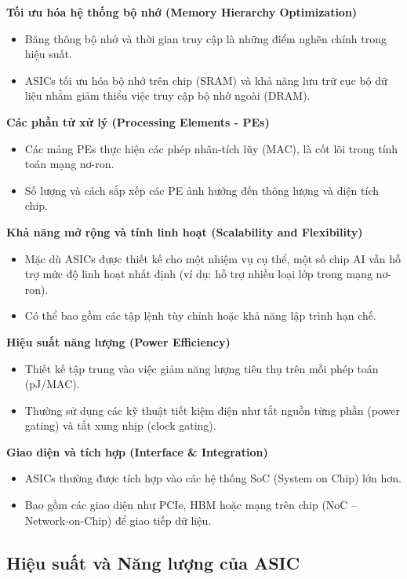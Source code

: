 \documentclass[a4paper]{article}
\begin{document}
\textbf{Tối ưu hóa hệ thống bộ nhớ (Memory Hierarchy Optimization)}
\begin{itemize}
    \item Băng thông bộ nhớ và thời gian truy cập là những điểm nghẽn chính trong hiệu suất.
    \item ASICs tối ưu hóa bộ nhớ trên chip (SRAM) và khả năng lưu trữ cục bộ dữ liệu nhằm giảm thiểu việc truy cập bộ nhớ ngoài (DRAM).
\end{itemize}

\textbf{Các phần tử xử lý (Processing Elements - PEs)}
\begin{itemize}
    \item Các mảng PEs thực hiện các phép nhân-tích lũy (MAC), là cốt lõi trong tính toán mạng nơ-ron.
    \item Số lượng và cách sắp xếp các PE ảnh hưởng đến thông lượng và diện tích chip.
\end{itemize}

\textbf{Khả năng mở rộng và tính linh hoạt (Scalability and Flexibility)}
\begin{itemize}
    \item Mặc dù ASICs được thiết kế cho một nhiệm vụ cụ thể, một số chip AI vẫn hỗ trợ mức độ linh hoạt nhất định (ví dụ: hỗ trợ nhiều loại lớp trong mạng nơ-ron).
    \item Có thể bao gồm các tập lệnh tùy chỉnh hoặc khả năng lập trình hạn chế.
\end{itemize}

\textbf{Hiệu suất năng lượng (Power Efficiency)}
\begin{itemize}
    \item Thiết kế tập trung vào việc giảm năng lượng tiêu thụ trên mỗi phép toán (pJ/MAC).
    \item Thường sử dụng các kỹ thuật tiết kiệm điện như tắt nguồn từng phần (power gating) và tắt xung nhịp (clock gating).
\end{itemize}

\textbf{Giao diện và tích hợp (Interface \& Integration)}
\begin{itemize}
    \item ASICs thường được tích hợp vào các hệ thống SoC (System on Chip) lớn hơn.
    \item Bao gồm các giao diện như PCIe, HBM hoặc mạng trên chip (NoC – Network-on-Chip) để giao tiếp dữ liệu.
\end{itemize}

\subsection{Hiệu suất và Năng lượng của ASIC}
\end{document}
